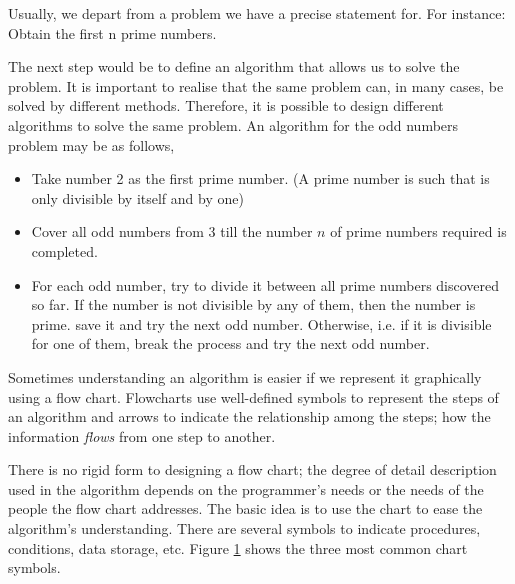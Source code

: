 \begin{paracol}{2}
 Usually, we depart from a problem we have a precise statement for. For instance: Obtain the first n prime numbers.

The next step would be to define an algorithm that allows us to solve the problem. It is important to realise that the same problem can, in many cases, be solved by different methods. Therefore, it is possible to design different algorithms to solve the same problem. An algorithm for the odd numbers problem may be as follows,

\begin{itemize}
    \item Take number 2 as the first prime number. (A prime number is such that is only divisible by itself and by one)
    \item Cover all odd numbers from 3 till the number $n$ of prime numbers required is completed.
    \item For each odd number, try to divide it between all prime numbers discovered so far. If the number is not divisible by any of them, then the number is prime. save it and try the next odd number. Otherwise, i.e. if it is divisible for one of them, break the process and try the next odd number.
\end{itemize}

Sometimes understanding an algorithm is easier if we represent it graphically using a flow chart. Flowcharts use well-defined symbols to represent the steps of an algorithm and arrows to indicate the relationship among the steps; how the information \emph{flows} from one step to another.

There is no rigid form to designing a flow chart; the degree of detail description used in the algorithm depends on the programmer's needs or the needs of the people the flow chart addresses. The basic idea is to use the chart to ease the algorithm's understanding. There are several symbols to indicate procedures, conditions, data storage, etc. Figure \ref{fig:flujo} shows the three most common chart symbols.
\end{paracol}

\begin{figure}
\centering
{}
\label{fig:flujo}
\end{figure}

